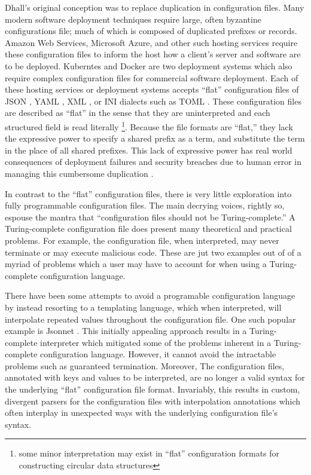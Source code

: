 \documentclass[12pt]{diazessay}
\begin{document}
Dhall's original conception was to replace duplication in configuration files.
Many modern software deployment techniques require large, often byzantine configurations file; \cite{cuperus1995automatic} much of which is composed of duplicated prefixes or records.
Amazon Web Services, Microsoft Azure, and other such hosting services require these configuration files to inform the host how a client's server and software are to be deployed.
Kuberntes \cite{Kubernetes2015} and Docker \cite{Barbier2014} are two deployment systems which also require complex configuration files for commercial software deployment.
Each of these hosting services or deployment systems accepts ``flat'' configuration files of JSON \cite{ecma2017standard}, YAML \cite{ben2009yaml}, XML \cite{bray2000extensible}, or INI dialects such as TOML \cite{TOML}.
These configuration files are described as ``flat'' in the sense that they are uninterpreted and each structured field is read literally \footnote{some minor interpretation may exist in ``flat'' configuration formats for constructing circular data structures}.
Because the file formats are ``flat,'' they lack the expressive power to specify a shared prefix as a term, and substitute the term in the place of all shared prefixes.
This lack of expressive power has real world consequences of deployment failures and security breaches due to human error in managing this cumbersome duplication \cite{Fugue2020}.

In contrast to the ``flat'' configuration files, there is very little exploration into fully programmable configuration files.
The main decrying voices, rightly so, espouse the mantra that ``configuration files should not be Turing-complete.'' A Turing-complete \cite{turing1937computable} configuration file does present many theoretical and practical problems.
For example, the configuration file, when interpreted, may never terminate or may execute malicious code.
These are jut two examples out of of a myriad of problems which a user may have to account for when using a Turing-complete configuration language.

There have been some attempts to avoid a programable configuration language by instead resorting to a templating language, which when interpreted, will interpolate repeated values throughout the configuration file.
One such popular example is Jsonnet \cite{JSONnet}.
This initially appealing approach results in a Turing-complete interpreter which mitigated some of the problems inherent in a Turing-complete configuration language.
However, it cannot avoid the intractable problems such as guaranteed termination.
Moreover, The configuration files, annotated with keys and values to be interpreted, are no longer a valid syntax for the underlying ``flat'' configuration file format.
Invariably, this results in custom, divergent parsers for the configuration files with interpolation annotations which often interplay in unexpected ways with the underlying configuration file's syntax.
\end{document}
